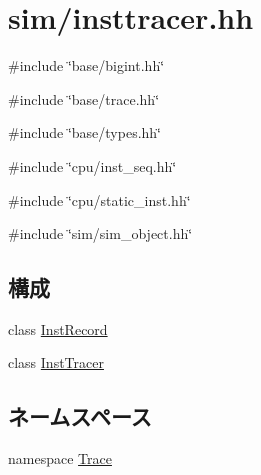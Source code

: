 \hypertarget{insttracer_8hh}{
\section{sim/insttracer.hh}
\label{insttracer_8hh}
}
{\ttfamily \#include \char`\"{}base/bigint.hh\char`\"{}}\par
{\ttfamily \#include \char`\"{}base/trace.hh\char`\"{}}\par
{\ttfamily \#include \char`\"{}base/types.hh\char`\"{}}\par
{\ttfamily \#include \char`\"{}cpu/inst\_\-seq.hh\char`\"{}}\par
{\ttfamily \#include \char`\"{}cpu/static\_\-inst.hh\char`\"{}}\par
{\ttfamily \#include \char`\"{}sim/sim\_\-object.hh\char`\"{}}\par
\subsection*{構成}
\begin{DoxyCompactItemize}
\item 
class \hyperlink{classTrace_1_1InstRecord}{InstRecord}
\item 
class \hyperlink{classTrace_1_1InstTracer}{InstTracer}
\end{DoxyCompactItemize}
\subsection*{ネームスペース}
\begin{DoxyCompactItemize}
\item 
namespace \hyperlink{namespaceTrace}{Trace}
\end{DoxyCompactItemize}
